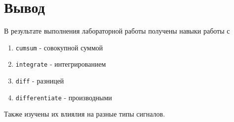 \documentclass[a4paper,12pt]{article}
\begin{document}
	\section{Вывод}
	
	В результате выполнения лабораторной работы получены навыки работы с
	
	\begin{enumerate} 
		\item \texttt{cumsum} - совокупной суммой
		\item \texttt{integrate} - интегрированием
		\item \texttt{diff} - разницей
		\item \texttt{differentiate} - производными
	\end{enumerate} 
	Также изучены их влиялия на разные типы сигналов.
	
\end{document}
